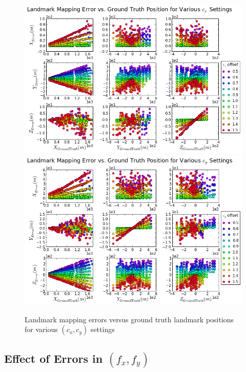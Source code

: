 \begin{figure}[h]
  \centering
  \includegraphics[width=13cm, keepaspectratio=true]{./Figures/SimulationFigures/Figure32.png}
  \includegraphics[width=13cm, keepaspectratio=true]{./Figures/SimulationFigures/Figure33.png}
  \caption{Landmark mapping errors versus ground truth
    landmark positions for various $(c_x, c_y)$ settings}
  \label{fig:simfig32-33}
\end{figure}
\FloatBarrier

\subsection{Effect of Errors in $(f_x, f_y)$}

